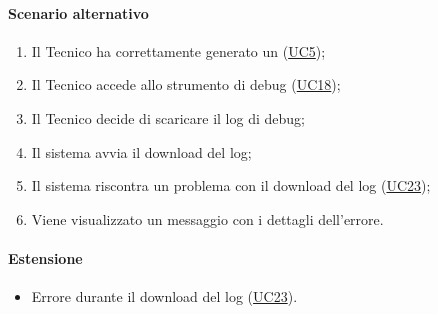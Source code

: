 \paragraph*{Scenario alternativo}
\begin{enumerate}
  \item Il Tecnico ha correttamente generato un  (\hyperref[UC5]{UC5});
  \item Il Tecnico accede allo strumento di debug (\hyperref[UC18]{UC18});
  \item Il Tecnico decide di scaricare il log di debug;
  \item Il sistema avvia il download del log;
  \item Il sistema riscontra un problema con il download del log (\hyperref[UC23]{UC23});
  \item Viene visualizzato un messaggio con i dettagli dell'errore.
\end{enumerate}

\paragraph*{Estensione}
\begin{itemize}
  \item Errore durante il download del log (\hyperref[UC23]{UC23}).
\end{itemize}